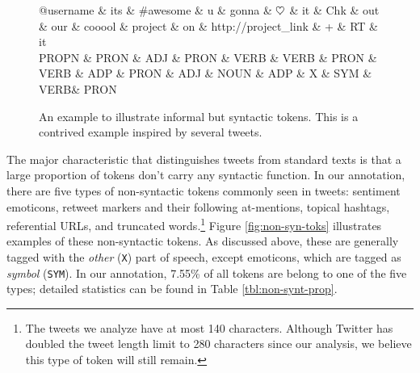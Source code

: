 \documentclass[11pt,a4paper]{article}
\newcommand{\heart}{\ensuremath\heartsuit}
\newcommand{\yjcomment}[1]{\textcolor{orange}{[$_\mathrm{L}^\mathrm{Y}$#1]}}
\newcommand{\yicomment}[1]{\textcolor{gray}{[#1 ---\textsc{yi}]}}
\begin{document}
\begin{figure}[t]
	\centering
	\small
	\begin{dependency}[edge slant=2, text only label, label style=above]
		\begin{deptext}
			@username \& its \& \#awesome \& u \& gonna \& $\heart$ \& it \& Chk \& out \& our \& cooool \& project \& on \& http://project\_link \& + \& RT \& it\\
			\tiny PROPN \& \tiny PRON \& \tiny ADJ \& \tiny PRON \& \tiny VERB \& \tiny VERB \& \tiny PRON \& \tiny VERB \& \tiny ADP \& \tiny PRON \& \tiny ADJ \& \tiny NOUN \& \tiny ADP \& \tiny X \& \tiny SYM \& \tiny VERB\& \tiny PRON\\
		\end{deptext}
	\end{dependency}
	\caption{An example to illustrate informal but syntactic tokens.
		This is a contrived example inspired by several tweets.}\label{fig:informal-toks}
\end{figure}

The major characteristic that distinguishes tweets from standard texts is that
a large proportion of tokens don't carry any syntactic function. 
In our annotation, there are five types of non-syntactic tokens commonly seen in tweets: %
sentiment emoticons, retweet markers and their following at-mentions, topical hashtags, referential URLs, and
truncated words.\footnote{The tweets we analyze have at most 140
  characters. Although Twitter has doubled the tweet length limit to
  280 characters since our analysis, we believe this type of token
  will still remain.}  Figure \ref{fig:non-syn-toks} illustrates examples of
these non-syntactic tokens.  As discussed above, these are generally
tagged with the \emph{other} (\texttt{X}) part of speech, except
emoticons, which are tagged as \emph{symbol} (\texttt{SYM}).  In our annotation, 
7.55\% of all tokens are belong to one of the five types; detailed statistics can be found in Table \ref{tbl:non-synt-prop}.
\end{document}
